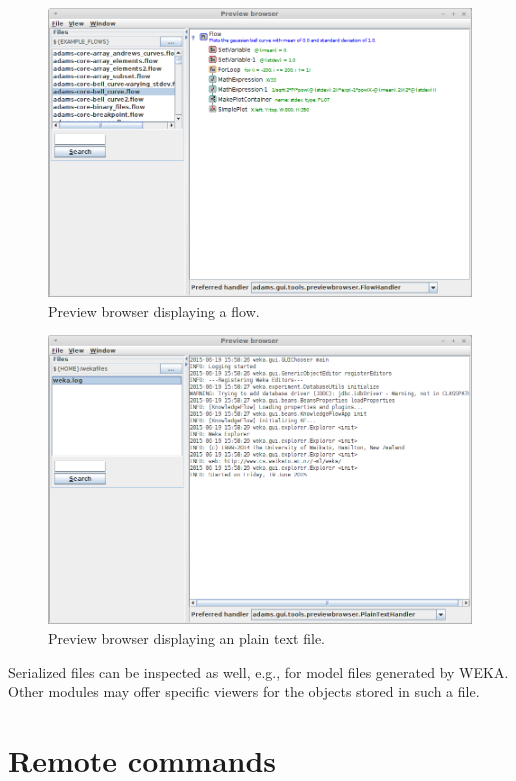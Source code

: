 \begin{figure}[htb]
  \centering
  \includegraphics[width=12.0cm]{images/previewbrowser-flow1.png}
  \caption{Preview browser displaying a flow.}
  \label{previewbrowser-flow1}
\end{figure}

\begin{figure}[htb]
  \centering
  \includegraphics[width=12.0cm]{images/previewbrowser-plaintext1.png}
  \caption{Preview browser displaying an plain text file.}
  \label{previewbrowser-plaintext1}
\end{figure}

Serialized files can be inspected as well, e.g., for model files generated 
by WEKA. Other modules may offer specific viewers for the objects stored
in such a file.


\chapter{Remote commands}

